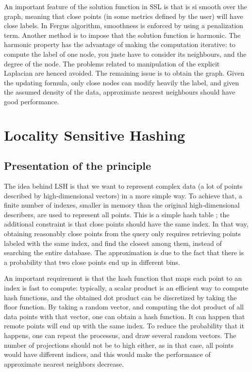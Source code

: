 \documentclass{article} %
\begin{document}
An important feature of the solution function in SSL is that is si smooth over the graph, meaning that close points (in some metrics defined by the user) will have close labels. In Fergus algorithm, smoothness is enforced by using a penalization term. Another method is to impose that the solution function is harmonic. The harmonic property has the advantage of making the computation iterative: to compute the label of one node, you juste have to consider its neighbours, and the degree of the node. The problems related to manipulation of the explicit Laplacian are henced avoided. The remaining issue is to obtain the graph. Given the updating formula, only close nodes can modify heavily the label, and given the assumed density of the data, approximate nearest neighbours should have good performance.

\section{Locality Sensitive Hashing}
\subsection{Presentation of the principle}
The idea behind LSH is that we want to represent complex data (a lot of points described by high-dimensional vectors) in a more simple way. To achieve that, a finite number of indexes, smaller in memory than the original high-dimensional describers, are used to represent all points. This is a simple hash table ; the additional constraint is that close points should have the same index. In that way, obtaining reasonably close points from the query only requires retrieving points labeled with the same index, and find the closest among them, instead of searching the entire database. The approximation is due to the fact that there is a probability that two close points end up in different bins.

An important requirement is that the hash function that maps each point to an index is fast to compute: typically, a scalar product is an efficient way to compute hash functions, and the obtained dot product can be discretized by taking the floor function. By taking a random vector, and computing the dot product of all data points with that vector, one can obtain a hash function. It can happen that remote points will end up with the same index. To reduce the probability that it happens, one can repeat the processus, and draw several random vectors. The number of projections should not be to high either, as in that case, all points would have different indices, and this would make the performance of approximate nearest neighbors decrease.
\end{document}
